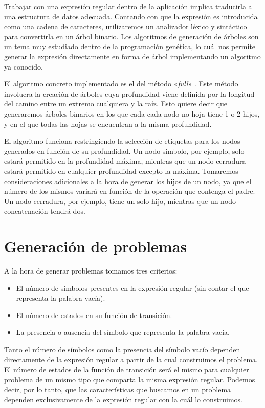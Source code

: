 
Trabajar con una expresión regular dentro de la aplicación implica traducirla a una estructura de datos adecuada.
Contando con que la expresión es introducida como una cadena de caracteres, utilizaremos un analizador léxico y sintáctico para convertirla en un árbol binario.
Los algoritmos de generación de árboles son un tema muy estudiado dentro de la programación genética, lo cuál nos permite generar la expresión directamente en forma de árbol implementando un algoritmo ya conocido.

El algoritmo concreto implementado es el del método «\emph{full}» \cite{koza92}.
Este método involucra la creación de árboles cuya profundidad viene definida por la longitud del camino entre un extremo cualquiera y la raíz.
Esto quiere decir que generaremos árboles binarios en los que cada cada nodo no hoja tiene 1 o 2 hijos, y en el que todas las hojas se encuentran a la misma profundidad.

El algoritmo funciona restringiendo la selección de etiquetas para los nodos generados en función de su profundidad.
Un nodo símbolo, por ejemplo, solo estará permitido en la profundidad máxima, mientras que un nodo cerradura estará permitido en cualquier profundidad excepto la máxima.
Tomaremos consideraciones adicionales a la hora de generar los hijos de un nodo, ya que el número de los mismos variará en función de la operación que contenga el padre.
Un nodo cerradura, por ejemplo, tiene un solo hijo, mientras que un nodo concatenación tendrá dos.

\section{Generación de problemas}

A la hora de generar problemas tomamos tres criterios:
\begin{itemize}
	\item El número de símbolos presentes en la expresión regular (sin contar el que representa la palabra vacía).
	\item El número de estados en su función de transición.
	\item La presencia o ausencia del símbolo que representa la palabra vacía.
\end{itemize}
Tanto el número de símbolos como la presencia del símbolo vacío dependen directamente de la expresión regular a partir de la cual construimos el problema.
El número de estados de la función de transición será el mismo para cualquier problema de un mismo tipo que comparta la misma expresión regular.
Podemos decir, por lo tanto, que las características que buscamos en un problema dependen exclusivamente de la expresión regular con la cuál lo construimos.

